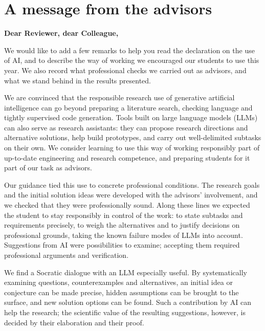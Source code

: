 \chapter*{A message from the advisors}

\noindent\textbf{Dear Reviewer, dear Colleague,}

We would like to add a few remarks to help you read the declaration on the use of AI, and to describe the way of working we encouraged our students to use this year. We also record what professional checks we carried out as advisors, and what we stand behind in the results presented.

We are convinced that the responsible research use of generative artificial intelligence can go beyond preparing a literature search, checking language and tightly supervised code generation. Tools built on large language models (LLMs) can also serve as research assistants: they can propose research directions and alternative solutions, help build prototypes, and carry out well-delimited subtasks on their own. We consider learning to use this way of working responsibly part of up-to-date engineering and research competence, and preparing students for it part of our task as advisors.

Our guidance tied this use to concrete professional conditions. The research goals and the initial solution ideas were developed with the advisors' involvement, and we checked that they were professionally sound. Along these lines we expected the student to stay responsibly in control of the work: to state subtasks and requirements precisely, to weigh the alternatives and to justify decisions on professional grounds, taking the known failure modes of LLMs into account. Suggestions from AI were possibilities to examine; accepting them required professional arguments and verification.

We find a Socratic dialogue with an LLM especially useful. By systematically examining questions, counterexamples and alternatives, an initial idea or conjecture can be made precise, hidden assumptions can be brought to the surface, and new solution options can be found. Such a contribution by AI can help the research; the scientific value of the resulting suggestions, however, is decided by their elaboration and their proof.

